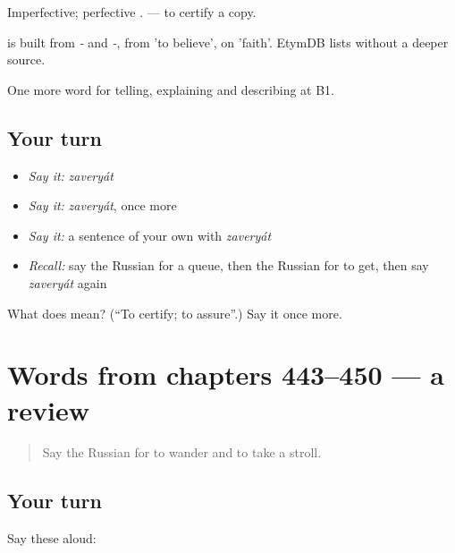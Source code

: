 Imperfective; perfective \emph{}. \emph{ } — to certify a copy.

\begin{cousinweb}
\emph{} is built from \emph{-} and \emph{-}, from \emph{} 'to believe', on \emph{} 'faith'. EtymDB lists \emph{} without a deeper source.
\end{cousinweb}

\begin{grammarlens}[title={What you've built}]
One more word for telling, explaining and describing at B1.
\end{grammarlens}

\subsection*{Your turn}
\begin{itemize}
\raggedright
  \item \emph{Say it:} \emph{zaveryát}
  \item \emph{Say it:} \emph{zaveryát}, once more
  \item \emph{Say it:} a sentence of your own with \emph{zaveryát}
  \item \emph{Recall:} say the Russian for a queue, then the Russian for to get, then say \emph{zaveryát} again
\end{itemize}

\begin{tcolorbox}[breakable,colback=teal!4,colframe=teal!35!black,title={Before you move on}]
What does  mean? (\textquotedblleft{}To certify; to assure\textquotedblright{}.) Say it once more.
\end{tcolorbox}
\section[(dialogue)]{Words from chapters 443–450 — a review}

\label{lesson:RU-R450-review-443-450}



\begin{quote}
Say the Russian for to wander and to take a stroll.
\end{quote}

\subsection*{Your turn}
Say these aloud:

